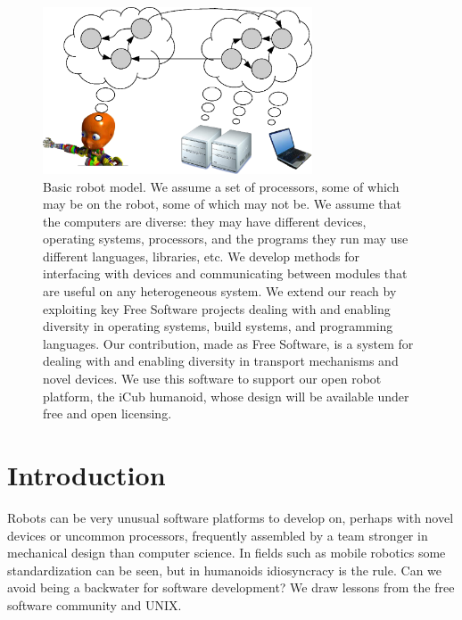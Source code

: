 

\begin{figure}
\centerline{
\includegraphics[width=8cm]{fig-nethead}
}
\caption{
%
Basic robot model.  We assume a set of processors, some of which may be
on the robot, some of which may not be.  We assume that the computers
are diverse: they may have different devices, operating systems,
processors, and the programs they run may use different languages,
libraries, etc.  
%
We develop methods for interfacing with devices and communicating
between modules that are useful on any heterogeneous system.
%
We extend our reach by exploiting key Free Software projects
dealing with and enabling diversity in operating systems, build systems, 
and programming languages.
%
Our contribution, made as Free Software, is a system for dealing
with and enabling diversity in transport mechanisms and novel devices.
%
%
%
We use this software to support our open robot platform, the iCub
humanoid, whose design will be available under free and open
licensing.
%
}
\end{figure}


\section{Introduction}


Robots can be very unusual software platforms to develop on, perhaps
with novel devices or uncommon processors, frequently assembled by a
team stronger in mechanical design than computer science.  In fields
such as mobile robotics some standardization can be seen, but in
humanoids idiosyncracy is the rule.  Can we avoid being a backwater for
software development?  We draw lessons from the free software community
and UNIX.


